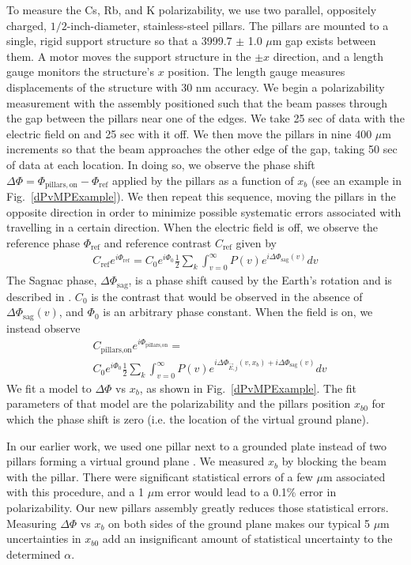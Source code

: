 \documentclass[twocolumn,pra,showpacs,superscriptaddress,longbibliography]{revtex4-1}   %
\newcommand{\figref}[1]{Fig.~\ref{#1}}
\newcommand{\dphisag}{\Delta\Phi_{\mathrm{sag}}}
\begin{document}
To measure the Cs, Rb, and K polarizability, we use two parallel, oppositely charged, $1/2$-inch-diameter, stainless-steel pillars. The pillars are mounted to a single, rigid support structure so that a 3999.7 $\pm$ 1.0 $\mu$m gap exists between them. A motor moves the support structure in the $\pm x$ direction, and a length gauge monitors the structure's $x$ position. The length gauge measures displacements of the structure with 30 nm accuracy. 
We begin a polarizability measurement with the assembly positioned such that the beam passes through the gap between the pillars near one of the edges.
We take 25 sec of data with the electric field on and 25 sec with it off.
We then move the pillars in nine 400 $\mu$m increments so that the beam approaches the other edge of the gap, taking 50 sec of data at each location.
In doing so, we
observe the phase shift $\Delta\Phi = \Phi_{\mathrm{pillars,on}} - \Phi_{\mathrm{ref}}$ applied by the pillars as a function of $x_b$ (see an example in \figref{dPvMPExample}). 
We then repeat this sequence, moving the pillars in the opposite direction in order to minimize possible systematic errors associated with travelling in a certain direction.
When the electric field is off, we observe the reference phase $\Phi_{\mathrm{ref}}$ and reference contrast $C_{\mathrm{ref}}$ given by 
\begin{align}
	C_{\mathrm{ref}}e^{i\Phi_{\mathrm{ref}}} = 
		C_0e^{i\Phi_0} \frac{1}{2} \sum_k
		\int_{v=0}^{\infty} P(v)
		e^{i\dphisag(v)} 
		dv
	\label{CPPolesRef}
\end{align}
The Sagnac phase, $\dphisag$, is a phase shift caused by the Earth's rotation and is described in \cite{Holmgren2010,Lenef1997,Jacquey2008}.
$C_0$ is the contrast that would be observed in the absence of $\dphisag(v)$, and $\Phi_0$ is an arbitrary phase constant.
When the field is on, we instead observe
\begin{align}
	& C_{\textrm{pillars,on}}e^{i\Phi_{\textrm{pillars,on}}} = \nonumber \\
		& C_0e^{i\Phi_0}		
		\frac{1}{2} \sum_k
		\int_{v=0}^{\infty} P(v)
		e^{
			i\Delta\Phi_{\vec{E},j}(v,x_b) + 
			i\dphisag(v)
		} 
		dv
	\label{CPPolesEOn}
\end{align}
We fit a model to $\Delta\Phi$ vs $x_b$, as shown in \figref{dPvMPExample}. The fit parameters of that model are the polarizability and the pillars position $x_{b0}$ for which the phase shift is zero (i.e. the location of the virtual ground plane). 

In our earlier work, we used one pillar next to a grounded plate instead of two pillars forming a virtual ground plane \cite{Holmgren2010}. We measured $x_b$ by blocking the beam with the pillar. There were significant statistical errors of a few $\mu$m associated with this procedure, and a 1 $\mu$m error would lead to a 0.1\% error in polarizability. 
Our new pillars assembly greatly reduces those statistical errors. Measuring $\Delta\Phi$ vs $x_b$ on both sides of the ground plane makes our typical 5 $\mu$m uncertainties in $x_{b0}$ add an insignificant amount of 
statistical uncertainty to the determined $\alpha$.
\end{document}
